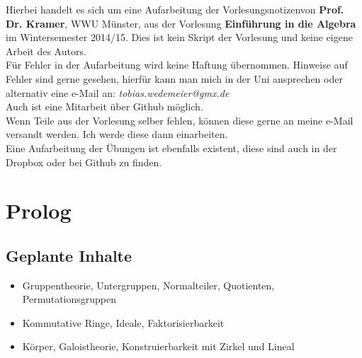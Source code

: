 

\newcommand{\vorlesung}{Einführung in die Algebra}
\newcommand{\Prof}{Prof. Dr. Kramer}
\newcommand{\subt}{Aufarbeitung der Vorlesungsnotizen}





\maketitle
\thispagestyle{empty}
\cleardoubleoddemptypage

\thispagestyle{empty}
\vspace*{\fill}
\begin{center}
	Hierbei handelt es sich um eine \subt von \textbf{\Prof}, WWU Münster, aus der Vorlesung \textbf{\vorlesung} im Wintersemester 2014/15. Dies ist kein Skript der Vorlesung und keine eigene Arbeit des Autors.\\
	\vspace{2cm}
	Für Fehler in der Aufarbeitung wird keine Haftung übernommen. Hinweise auf Fehler sind gerne gesehen, hierfür kann man mich in der Uni ansprechen oder alternativ eine e-Mail an: \textit{tobias.wedemeier@gmx.de}\\
	Auch ist eine Mitarbeit über Github möglich.\\
	\vspace{2cm}
	Wenn Teile aus der Vorlesung selber fehlen, können diese gerne an meine e-Mail versandt werden. Ich werde diese dann einarbeiten.\\
	\vspace{2cm}
	Eine Aufarbeitung der Übungen ist ebenfalls existent, diese sind auch in der Dropbox oder bei Github zu finden.
\end{center}
\vspace*{\fill}
\newpage


\tableofcontents
\cleardoubleoddemptypage %


\thispagestyle{empty}
\section*{Prolog}  %
\label{sec:prolog_alg}
\subsection*{Geplante Inhalte}
\begin{itemize}
	\item Gruppentheorie, Untergruppen, Normalteiler, Quotienten, Permutationsgruppen
	\item Kommutative Ringe, Ideale, Faktorisierbarkeit
	\item Körper, Galoistheorie, Konstruierbarkeit mit Zirkel und Lineal
\end{itemize}

